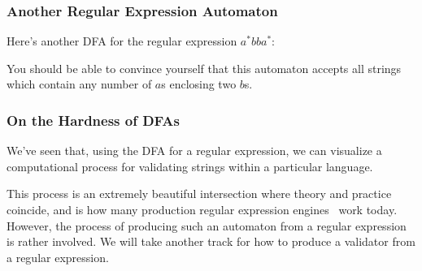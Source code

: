 \documentclass[aspectratio=169]{beamer}
\begin{document}
\begin{frame}[fragile]
  \frametitle{Another Regular Expression Automaton}

  Here's another DFA for the regular expression $a^*bba^*$:

  \vspace{\fill}


  You should be able to convince yourself that this automaton accepts
  all strings which contain any number of $a$s enclosing two $b$s.
\end{frame}


\begin{frame}[fragile]
  \frametitle{On the Hardness of DFAs}

  We've seen that, using the DFA for a regular expression, we can
  visualize a computational process for validating strings within a
  particular language.

  This process is an extremely beautiful intersection where theory and
  practice coincide, and is how many production regular expression engines\footnotemark 
  \, work today. However, the process of producing such an automaton from
  a regular expression is rather involved. We will take another track
  for how to produce a validator from a regular expression.

\end{frame}
\end{document}
